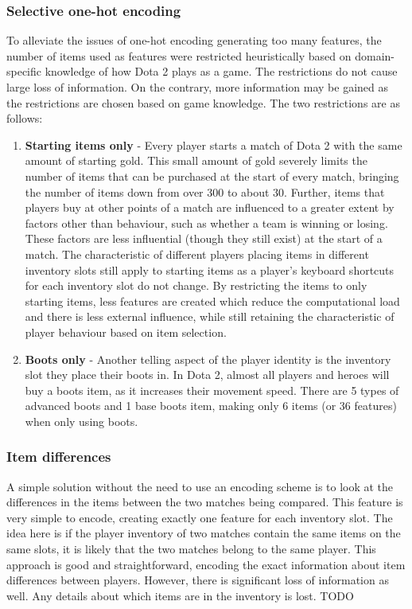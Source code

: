\documentclass[Report.tex]{subfiles}
\begin{document}
\subsubsection{Selective one-hot encoding}
To alleviate the issues of one-hot encoding generating too many features, the number of items used as features were restricted heuristically based on domain-specific knowledge of how Dota 2 plays as a game. The restrictions do not cause large loss of information. On the contrary, more information may be gained as the restrictions are chosen based on game knowledge. The two restrictions are as follows:
\begin{enumerate}
\item \textbf{Starting items only} - Every player starts a match of Dota 2 with the same amount of starting gold. This small amount of gold severely limits the number of items that can be purchased at the start of every match, bringing the number of items down from over 300 to about 30. Further, items that players buy at other points of a match are influenced to a greater extent by factors other than behaviour, such as whether a team is winning or losing. These factors are less influential (though they still exist) at the start of a match. The characteristic of different players placing items in different inventory slots still apply to starting items as a player's keyboard shortcuts for each inventory slot do not change. By restricting the items to only starting items, less features are created which reduce the computational load and there is less external influence, while still retaining the characteristic of player behaviour based on item selection. 
\item \textbf{Boots only} - Another telling aspect of the player identity is the inventory slot they place their boots in. In Dota 2, almost all players and heroes will buy a boots item, as it increases their movement speed. There are 5 types of advanced boots and 1 base boots item, making only 6 items (or 36 features) when only using boots. 
\end{enumerate}




\subsubsection{Item differences}
A simple solution without the need to use an encoding scheme is to look at the differences in the items between the two matches being compared. This feature is very simple to encode, creating exactly one feature for each inventory slot. The idea here is if the player inventory of two matches contain the same items on the same slots, it is likely that the two matches belong to the same player. This approach is good and straightforward, encoding the exact information about item differences between players. However, there is significant loss of information as well. Any details about which items are in the inventory is lost. TODO
 
\end{document}
